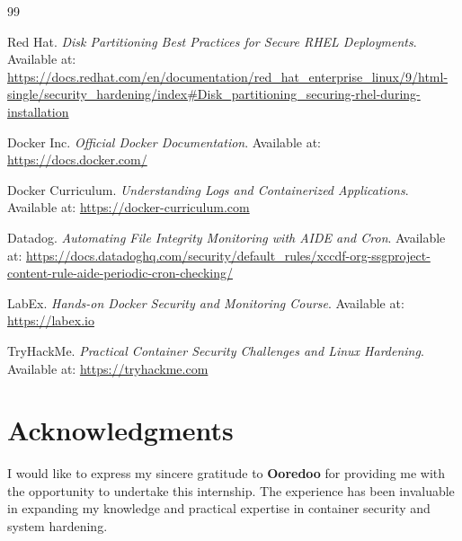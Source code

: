 \documentclass[12pt,a4paper]{report}
\begin{document}
\newpage
\pagestyle{empty}  %
\renewcommand{\headrulewidth}{0pt} %
\renewcommand{\footrulewidth}{0pt} %
\listoffigures
\thispagestyle{empty}  %

\newpage
\pagestyle{empty}  %
\renewcommand{\headrulewidth}{0pt}
\renewcommand{\footrulewidth}{0pt}
\renewcommand{\bibname}{Webography}

\begin{thebibliography}{99}

 Red Hat. \textit{Disk Partitioning Best Practices for Secure RHEL Deployments}.  
Available at: \url{https://docs.redhat.com/en/documentation/red_hat_enterprise_linux/9/html-single/security_hardening/index#Disk_partitioning_securing-rhel-during-installation}  

 Docker Inc. \textit{Official Docker Documentation}.  
Available at: \url{https://docs.docker.com/}  

 Docker Curriculum. \textit{Understanding Logs and Containerized Applications}.  
Available at: \url{https://docker-curriculum.com}  

 Datadog. \textit{Automating File Integrity Monitoring with AIDE and Cron}.  
Available at: \url{https://docs.datadoghq.com/security/default_rules/xccdf-org-ssgproject-content-rule-aide-periodic-cron-checking/}  

 LabEx. \textit{Hands-on Docker Security and Monitoring Course}.  
Available at: \url{https://labex.io}  

 TryHackMe. \textit{Practical Container Security Challenges and Linux Hardening}.  
Available at: \url{https://tryhackme.com}  

\end{thebibliography}
\thispagestyle{empty} %

\newpage
\pagestyle{empty}  %
\renewcommand{\headrulewidth}{0pt}
\renewcommand{\footrulewidth}{0pt}
\chapter*{Acknowledgments}

I would like to express my sincere gratitude to \textbf{Ooredoo} for providing me with the opportunity to undertake this internship. The experience has been invaluable in expanding my knowledge and practical expertise in container security and system hardening.
\end{document}
